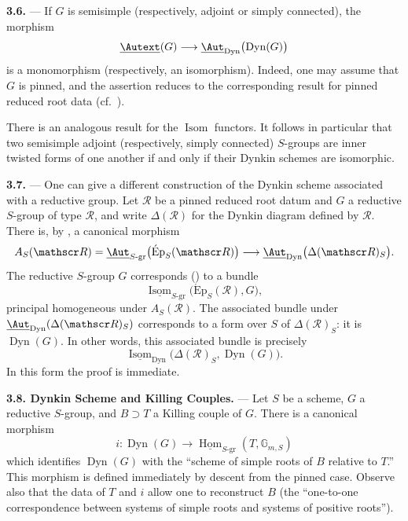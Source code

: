 \medskip\noindent\textbf{3.6.} ---
If \(G\) is semisimple (respectively, adjoint or simply connected),
the morphism
\[
  \underline{\Autext}(G)
  \longrightarrow
  \underline{\Aut}_{\mathrm{Dyn}}
    \bigl(\operatorname{Dyn}(G)\bigr)
\]
is a monomorphism (respectively, an isomorphism). Indeed, one may
assume that \(G\) is pinned, and the assertion reduces to the
corresponding result for pinned reduced root data
(cf.\ ).

There is an analogous result for the \(\operatorname{Isom}\) functors.
It follows in particular that two semisimple adjoint (respectively,
simply connected) \(S\)-groups are inner twisted forms of one another
if and only if their Dynkin schemes are isomorphic.


\medskip\noindent\textbf{3.7.} ---
One can give a different construction of the Dynkin scheme associated
with a reductive group. Let \(\mathscr R\) be a pinned reduced root
datum and \(G\) a reductive \(S\)-group of type \(\mathscr R\), and
write \(\Delta(\mathscr R)\) for the Dynkin diagram defined by
\(\mathscr R\). There is, by , a canonical morphism
\[
  A_S(\mathscr R)
  =
  \underline{\Aut}_{S\text{-}\mathrm{gr}}
    \bigl(\operatorname{\acute{E}p}_S(\mathscr R)\bigr)
  \longrightarrow
  \underline{\Aut}_{\mathrm{Dyn}}
    \bigl(\Delta(\mathscr R)_S\bigr).
\]
The reductive \(S\)-group \(G\) corresponds () to a bundle
\[
  \underline{\operatorname{Isom}}_{S\text{-}\mathrm{gr}}
    \bigl(\operatorname{\acute{E}p}_S(\mathscr R),G\bigr),
\]
principal homogeneous under \(A_S(\mathscr R)\). The associated
bundle under
\(\underline{\Aut}_{\mathrm{Dyn}}(\Delta(\mathscr R)_S)\)
corresponds to a form over \(S\) of \(\Delta(\mathscr R)_S\): it is
\(\operatorname{Dyn}(G)\). In other words, this associated bundle is
precisely
\[
  \underline{\operatorname{Isom}}_{\mathrm{Dyn}}
    \bigl(\Delta(\mathscr R)_S,\operatorname{Dyn}(G)\bigr).
\]
In this form the proof is immediate.

\medskip\noindent\textbf{3.8. Dynkin Scheme and Killing Couples.} ---
Let \(S\) be a scheme, \(G\) a reductive \(S\)-group, and
\(B\supset T\) a Killing couple of \(G\). There is a canonical
morphism
\[
  i:\operatorname{Dyn}(G)
  \longrightarrow
  \underline{\operatorname{Hom}}_{S\text{-}\mathrm{gr}}
    (T,\mathbb G_{m,S})
\]
which identifies \(\operatorname{Dyn}(G)\) with the ``scheme of
simple roots of \(B\) relative to \(T\).'' This morphism is defined
immediately by descent from the pinned case. Observe also that the
data of \(T\) and \(i\) allow one to reconstruct \(B\) (the
``one-to-one correspondence between systems of simple roots and
systems of positive roots'').

